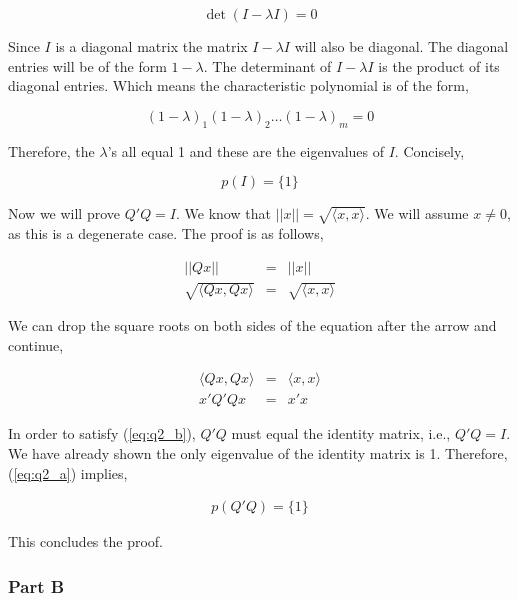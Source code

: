 \begin{equation}
  \det(I - \lambda I)=0
\end{equation}

Since \(I\) is a diagonal matrix the matrix \(I - \lambda I\) will also be diagonal.
The diagonal entries will be of the form \(1 - \lambda\).
The determinant of \(I - \lambda I\) is the product of its diagonal entries.
Which means the characteristic polynomial is of the form,

\begin{equation}
  {(1 - \lambda)}_1 {(1 - \lambda)}_2 \ldots {(1 - \lambda)}_m = 0
\end{equation}

Therefore, the \(\lambda\)'s all equal 1 and these are the eigenvalues of \(I\).
Concisely,

\begin{equation}
  \boxed{p(I) = \{1\}}
  \label{eq:q2_a}
\end{equation}

Now we will prove \(Q'Q = I\).
We know that \(||x|| = \sqrt{\langle x,x \rangle}\).
We will assume \(x \ne 0\), as this is a degenerate case.
The proof is as follows,

\begin{eqnarray}
  ||Qx|| &=& ||x|| \\
  \sqrt{\langle Qx,Qx \rangle} &=& \sqrt{\langle x,x \rangle}
\end{eqnarray}

We can drop the square roots on both sides of the equation after the arrow and continue,

\begin{eqnarray}
  \langle Qx,Qx \rangle &=& \langle x,x \rangle \\
  x'Q'Qx &=& x'x
  \label{eq:q2_b}
\end{eqnarray} 

In order to satisfy (\ref{eq:q2_b}), \(Q'Q\) must equal the identity matrix, i.e., \(Q'Q = I\).
We have already shown the only eigenvalue of the identity matrix is 1.
Therefore, (\ref{eq:q2_a}) implies,

\begin{eqnarray}
  \boxed{p(Q'Q) = \{1\}}
\end{eqnarray}

This concludes the proof.

\newpage
\subsubsection{Part B}

